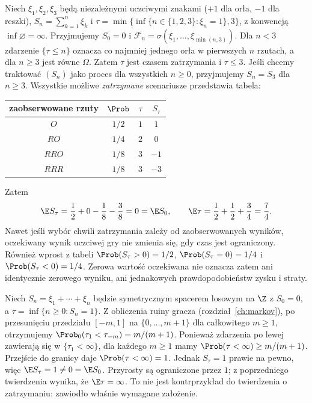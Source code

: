 \begin{przyklad}
Niech $\xi_1,\xi_2,\xi_3$ będą niezależnymi uczciwymi
znakami ($+1$ dla orła, $-1$ dla reszki),
$S_n=\sum_{k=1}^n\xi_k$ i
$\tau=\min\{\inf\{n\in\{1,2,3\}:\xi_n=1\},3\}$,
z konwencją $\inf\varnothing=\infty$.
Przyjmujemy $S_0=0$ i
$\mathcal F_n=\sigma(\xi_1,\ldots,\xi_{\min(n,3)})$.
Dla $n<3$ zdarzenie $\{\tau\leq n\}$ oznacza
co najmniej jednego orła w pierwszych $n$ rzutach,
a dla $n\geq3$ jest równe $\Omega$.
Zatem $\tau$ jest czasem zatrzymania i $\tau\leq3$.
Jeśli chcemy traktować $(S_n)$ jako proces
dla wszystkich $n\geq0$, przyjmujemy $S_n=S_3$
dla $n\geq3$. Wszystkie możliwe \emph{zatrzymane} scenariusze
przedstawia tabela:
\begin{center}
\begin{tabular}{c|c|c|c}
zaobserwowane rzuty & $\Prob$ & $\tau$ & $S_\tau$\\\hline
$O$ & $1/2$ & $1$ & $1$\\
$RO$ & $1/4$ & $2$ & $0$\\
$RRO$ & $1/8$ & $3$ & $-1$\\
$RRR$ & $1/8$ & $3$ & $-3$
\end{tabular}
\end{center}
Zatem
\[
\E S_\tau=\frac12+0-\frac18-\frac38=0
=\E S_0,\qquad
\E\tau=\frac12+\frac12+\frac34=\frac74.
\]
Nawet jeśli wybór chwili zatrzymania zależy od
zaobserwowanych wyników, oczekiwany wynik uczciwej
gry nie zmienia się, gdy czas jest ograniczony.
Również wprost z tabeli
$\Prob(S_\tau>0)=1/2$, $\Prob(S_\tau=0)=1/4$
i $\Prob(S_\tau<0)=1/4$.
Zerowa wartość oczekiwana nie oznacza zatem
ani identycznie zerowego wyniku, ani jednakowych
prawdopodobieństw zysku i straty.
\end{przyklad}

\begin{przyklad}
Niech $S_n=\xi_1+\cdots+\xi_n$ będzie symetrycznym
spacerem losowym na $\Z$ z $S_0=0$,
a $\tau=\inf\{n\geq0:S_n=1\}$.
Z obliczenia ruiny gracza
(rozdział~\ref{ch:markov}), po przesunięciu
przedziału $[-m,1]$ na $\{0,\ldots,m+1\}$
dla całkowitego $m\geq1$, otrzymujemy
$\Prob_0(\tau_1<\tau_{-m})=m/(m+1)$.
Ponieważ zdarzenia po lewej zawierają się
w $\{\tau_1<\infty\}$, dla każdego $m\geq1$
mamy $\Prob(\tau<\infty)\geq m/(m+1)$.
Przejście do granicy daje $\Prob(\tau<\infty)=1$. Jednak $S_\tau=1$
prawie na pewno, więc $\E S_\tau=1\ne0=\E S_0$.
Przyrosty są ograniczone przez $1$;
z poprzedniego twierdzenia wynika, że
$\E\tau=\infty$. To nie jest kontrprzykład
do twierdzenia o zatrzymaniu: zawiodło
właśnie wymagane założenie.
\end{przyklad}



